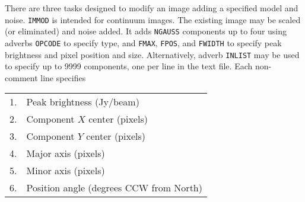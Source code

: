 \documentclass[twoside]{article}
\begin{document}
There are three tasks designed to modify an image adding a specified
model and noise.  {\tt IMMOD} is intended for continuum images.  The
existing image may be scaled (or eliminated) and noise added.  It adds
{\tt NGAUSS} components up to four using adverbs {\tt OPCODE} to
specify type, and {\tt FMAX}, {\tt FPOS}, and {\tt FWIDTH} to specify
peak brightness and pixel position and size.  Alternatively, adverb
{\tt INLIST} may be used to specify up to 9999 components, one per
line in the text file. Each non-comment line specifies
\begin{center}
\begin{tabular}{|r|l|}\hline
 1. & Peak brightness (Jy/beam)\\
 2. & Component $X$ center (pixels)\\
 3. & Component $Y$ center (pixels)\\
 4. & Major axis (pixels)\\
 5. & Minor axis (pixels)\\
 6. & Position angle (degrees CCW from North)\\ \hline
\end{tabular}
\end{center}
\end{document}
